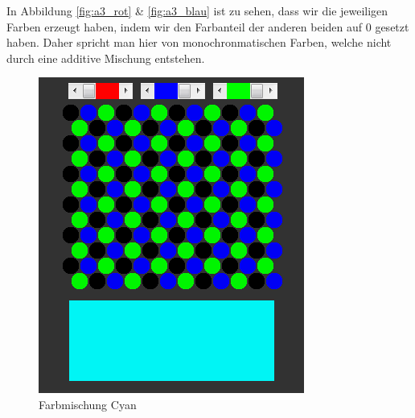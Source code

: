 \documentclass[a4paper]{article}
\begin{document}
In Abbildung \ref{fig:a3_rot} \& \ref{fig:a3_blau} ist zu sehen, dass wir die jeweiligen Farben erzeugt haben, indem wir den Farbanteil der anderen beiden auf 0 gesetzt haben. Daher spricht man hier von monochronmatischen Farben, welche nicht durch eine additive Mischung entstehen.

\vspace{2.5\baselineskip}
\begin{figure}[H]
    \centering
    \begin{minipage}[b]{0.45\textwidth}
    	\includegraphics[width=0.9\columnwidth]{images/A3_cyan.PNG}
    	\centering
    	\caption{Farbmischung Cyan}
    	\label{fig:a3_cyan}
    \end{minipage}
    \hfill
    \begin{minipage}[b]{0.45\textwidth}

\end{minipage}
\end{figure}
\end{document}
